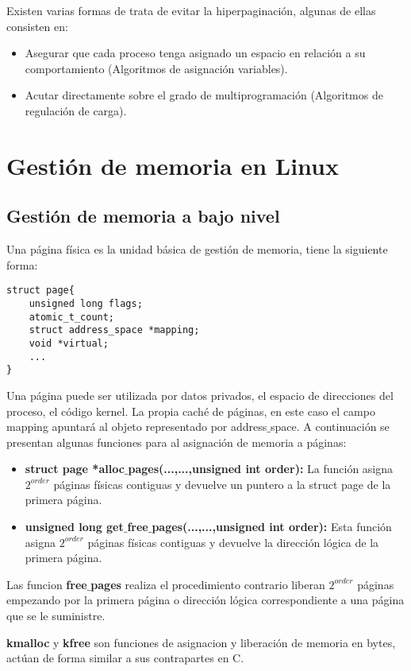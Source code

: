 Existen varias formas de trata de evitar la hiperpaginación, algunas de ellas consisten en:
\begin{itemize}
	\item Asegurar que cada proceso tenga asignado un espacio en relación a su comportamiento (Algoritmos de asignación variables).
	\item Acutar directamente sobre el grado de multiprogramación (Algoritmos de regulación de carga).
\end{itemize}

\section*{Gestión de memoria en Linux}

\subsection*{Gestión de memoria a bajo nivel}
Una página física es la unidad básica de gestión de memoria, tiene la siguiente forma:

\begin{lstlisting}
struct page{
	unsigned long flags;
	atomic_t_count;
	struct address_space *mapping;
	void *virtual;
	...
}
\end{lstlisting}

Una página puede ser utilizada por datos privados, el espacio de direcciones del proceso, el código kernel. La propia caché de páginas, en este caso el campo mapping apuntará al objeto representado por address$\_$space. A continuación se presentan algunas funciones para al asignación de memoria a páginas:

\begin{itemize}
	\item\textbf{struct page *alloc$\_$pages(...,...,unsigned int order):} La función asigna $2^{order}$ páginas físicas contiguas y devuelve un puntero a la struct page de la primera página.
	\item\textbf{unsigned long get$\_$free$\_$pages(...,...,unsigned int order):} Esta función asigna $2^{order}$ páginas físicas contiguas y devuelve la dirección lógica de la primera página.
\end{itemize}

Las funcion \textbf{free$\_$pages} realiza el procedimiento contrario liberan $2^{order}$ páginas empezando por la primera página o dirección lógica correspondiente a una página que se le suministre.

\textbf{kmalloc} y \textbf{kfree} son funciones de asignacion y liberación de memoria en bytes, actúan de forma similar a sus contrapartes en C.

